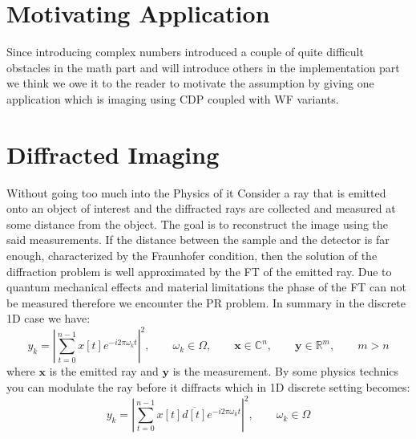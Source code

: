 \section{Motivating Application}

Since introducing complex numbers introduced a couple of quite difficult obstacles in the math part and will introduce others in the implementation part 
we think we owe it to the reader to motivate the assumption by giving one application which is imaging using \ac{CDP} coupled with \ac{WF} variants.

\section{Diffracted Imaging}\label{sec:diffracted_imaging}

Without going too much into the Physics of it Consider a ray that is emitted onto an object of interest and the diffracted rays are collected and measured at some distance from the object. 
The goal is to reconstruct the image using the said measurements. If the distance between the sample and the detector is far enough, characterized by the Fraunhofer condition\cite{Lipson1995}, 
then the solution of the diffraction problem is well approximated by the \ac{FT} of the emitted ray. Due to quantum mechanical effects\cite{DGDS2018}\cite{FranzSchwabl2007} and material limitations\cite{Shechtman2015} 
the phase of the \ac{FT} can not be measured therefore we encounter the \acl*{PR} problem. In summary in the discrete 1D case we have:
\begin{equation}
	y_k = \left| \sum_{t=0}^{n-1} x[t] e^{-i2\pi\omega_kt} \right|^2 , \qquad \omega_k \in \Omega, \qquad \boldsymbol{x} \in \mathbb{C}^n , \qquad \boldsymbol{y} \in \mathbb{R}^m, \qquad m > n 
\end{equation}
where $\boldsymbol{x}$ is the emitted ray and $\boldsymbol{y}$ is the measurement. By some physics technics\cite{Loewen2018}\cite{Candes2011} you can modulate 
the ray before it diffracts which in 1D discrete setting becomes:
\begin{equation}\label{eq:modulation_effect}
	y_k = \left| \sum_{t=0}^{n-1} x[t]\overline{d[t]} e^{-i2\pi\omega_kt} \right|^2 , \qquad \omega_k \in \Omega
\end{equation}

